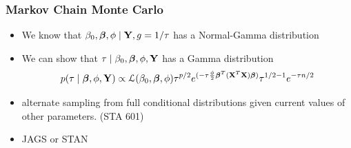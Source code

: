 \documentclass[]{beamer}\usepackage[]{graphicx}\usepackage[]{color}
\begin{document}
\begin{frame}[t] \frametitle{Markov Chain Monte Carlo}
\begin{itemize}
\item We know that $\beta_0, \boldsymbol{\beta}, \phi \mid \mathbf{Y}, g=1/\tau$ has a Normal-Gamma distribution  \pause
\item We can show that $\tau \mid \beta_0,\boldsymbol{\beta}, \phi, \mathbf{Y}$ has a Gamma distribution \pause
$$p(\tau \mid \boldsymbol{\beta}, \phi, \mathbf{Y}) \propto {\cal{L}}(\beta_0,\boldsymbol{\beta}, \phi)
\tau^{p/2} e^{( - \tau \frac{\phi}{2} \boldsymbol{\beta}^T (\mathbf{X}^T\mathbf{X}) \boldsymbol{\beta})}
\tau^{1/2 - 1} e^{ - \tau n/2}$$ \pause
\item alternate sampling from full conditional distributions given current values of other parameters.  (STA 601) \pause
\item JAGS or STAN
\end{itemize}
\end{frame}
\end{document}
